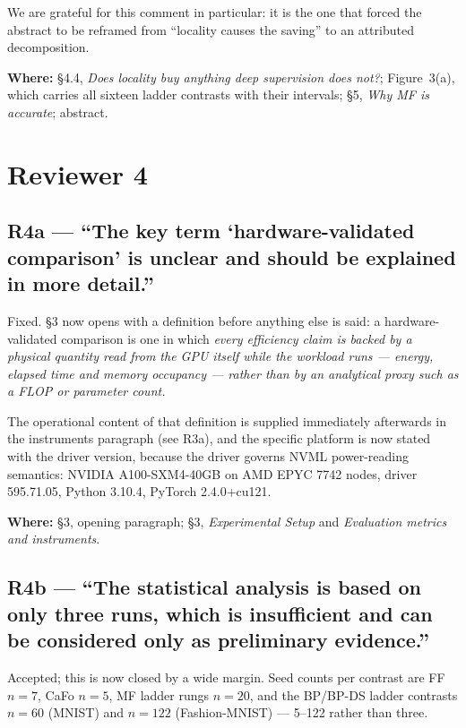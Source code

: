 \documentclass[11pt,a4paper]{article}
\newcommand{\FF}{FF}
\newcommand{\MF}{MF}
\newcommand{\BP}{BP}
\newcommand{\CaFo}{CaFo}
\newcommand{\BPDS}{BP-DS}
\newcommand{\where}[1]{\par\smallskip\noindent\textbf{Where:} #1\par}
\begin{document}
We are grateful for this comment in particular: it is the one that forced the
abstract to be reframed from ``locality causes the saving'' to an attributed
decomposition.

\where{\S4.4, \emph{Does locality buy anything deep supervision does not?};
Figure~3(a), which carries all sixteen ladder contrasts with their intervals;
\S5, \emph{Why \MF{} is accurate}; abstract.}

\section*{Reviewer 4}

\subsection*{R4a --- ``The key term `hardware-validated comparison' is unclear
and should be explained in more detail.''}

Fixed. \S3 now opens with a definition before anything else is said: a
hardware-validated comparison is one in which \emph{every efficiency claim is
backed by a physical quantity read from the GPU itself while the workload runs
--- energy, elapsed time and memory occupancy --- rather than by an analytical
proxy such as a FLOP or parameter count.}

The operational content of that definition is supplied immediately afterwards
in the instruments paragraph (see R3a), and the specific platform is now
stated with the driver version, because the driver governs NVML power-reading
semantics: NVIDIA A100-SXM4-40GB on AMD EPYC 7742 nodes, driver 595.71.05,
Python 3.10.4, PyTorch 2.4.0+cu121.

\where{\S3, opening paragraph; \S3, \emph{Experimental Setup} and
\emph{Evaluation metrics and instruments}.}

\subsection*{R4b --- ``The statistical analysis is based on only three runs,
which is insufficient and can be considered only as preliminary evidence.''}

Accepted; this is now closed by a wide margin. Seed counts per contrast are
\FF{} $n=7$, \CaFo{} $n=5$, \MF{} ladder rungs $n=20$, and the
\BP{}/\BPDS{} ladder contrasts $n=60$ (MNIST) and $n=122$ (Fashion-MNIST) ---
\numrange{5}{122} rather than three.
\end{document}
